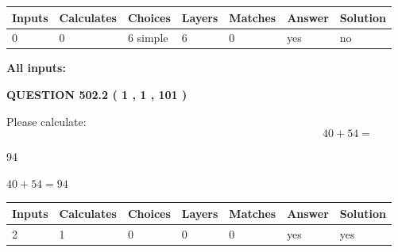\documentclass[12pt]{article}
\begin{document}
 
   
   
   
   
\noindent\begin{tabular}{|l|l|l|l|l|l|l|}
 \hline
Inputs & Calculates & Choices & Layers & Matches & Answer & Solution \\ \hline
 0  & 
 0  & 
 6
  simple  
  & 
 6  & 
 0  & 
  yes & 
  no 
  \\ \hline
 \end{tabular}
   
   
   
   
\noindent{}
   
   
   
   
\noindent\vspace{0.1in}\hspace{-0.08in} {\textbf{\Large{All inputs: }}}
   
   
  
\vspace{0.2in}
  
{\textbf{\Large{QUESTION
502.2 
 ( 1 , 1 , 101 )
}}}
  
  
 
Please calculate:
\begin{equation}
40 +  %
54 = \nonumber
\end{equation}
 
 
 
\noindent{}
 
 

94
 
 
\noindent{}
 
 

 
 
 
\noindent{}
 
 

$ %
40 +  %
54=   %
94$
 
 
\noindent{}
 
 

 
   
   
   
   
\noindent\begin{tabular}{|l|l|l|l|l|l|l|}
 \hline
Inputs & Calculates & Choices & Layers & Matches & Answer & Solution \\ \hline
 2  & 
 1  & 
 0
  & 
 0  & 
 0  & 
  yes & 
  yes 
  \\ \hline
 \end{tabular}
   
\end{document}
